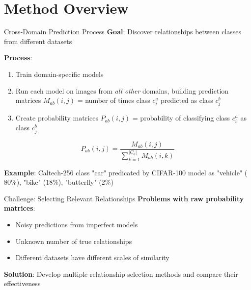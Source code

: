 \documentclass[aspectratio=169]{beamer}
\begin{document}
\section{Method Overview}

\begin{frame}{Cross-Domain Prediction Process}
    \textbf{Goal}: Discover relationships between classes from different datasets

    \vspace{0.5em}

    \textbf{Process}:
    \begin{enumerate}
        \item Train domain-specific models
        \item Run each model on images from \emph{all other} domains, building prediction matrices $M_{ab}(i,j)$ = number of times class $c_i^a$ predicted as class $c_j^b$
        \item Create probability matrices $P_{ab}(i,j)$ = probability of classifying class $c_i^a$ as class $c_j^b$
    \end{enumerate}

    \vspace{0.5em}

    \begin{equation}
        P_{ab}(i, j) = \frac{M_{ab}(i, j)}{\sum_{k=1}^{|C_a|} M_{ab}(i, k)}
    \end{equation}

    \vspace{0.5em}

    \textbf{Example}: Caltech-256 class "car" predicated by CIFAR-100 model as "vehicle" ($80\%$), "bike" ($18\%$), "butterfly" ($2\%$)
\end{frame}

\begin{frame}{Challenge: Selecting Relevant Relationships}
    \textbf{Problems with raw probability matrices}:
    \begin{itemize}
        \item Noisy predictions from imperfect models
        \item Unknown number of true relationships
        \item Different datasets have different scales of similarity
    \end{itemize}

    \vspace{1em}

    \textbf{Solution}: Develop multiple relationship selection methods and compare their effectiveness
\end{frame}
\end{document}
